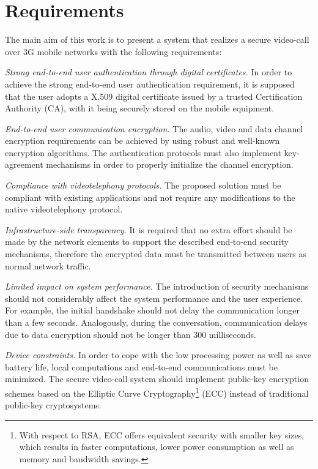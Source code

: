 \documentclass[10pt, conference, compsocconf]{IEEEtran}
\begin{document}
\section{Requirements}
\label{par:requirements}
The main aim of this work is to present a system that realizes a secure video-call over 3G mobile networks with the following requirements:
\begin{list}{}{\leftmargin=1em}
  \item \textit{Strong end-to-end user authentication through digital certificates.}
In order to achieve the strong end-to-end user authentication requirement, it is supposed that the user adopts a X.509 digital certificate issued by a trusted Certification Authority (CA), with it being securely stored on the mobile equipment.
  \item \textit{End-to-end user communication encryption.}
The audio, video and data channel encryption requirements can be achieved by using robust and well-known encryption algorithms. The authentication protocols must also implement key-agreement mechanisms in order to properly initialize the channel encryption.
  \item \textit{Compliance with videotelephony protocols.}
The proposed solution must be compliant with existing applications and not require any modifications to the native videotelephony protocol.
  \item \textit{Infrastructure-side transparency.}
It is required that no extra effort should be made by the network elements to support the described end-to-end security mechanisms, therefore the encrypted data must be transmitted between users as normal network traffic.
  \item \textit{Limited impact on system performance.}
The introduction of security mechanisms should not considerably affect the system performance and the user experience. For example, the initial handshake should not delay the communication longer than a few seconds. Analogously, during the conversation, communication delays due to data encryption should not be longer than 300 milliseconds.
\item \textit{Device constraints.}
In order to cope with the low processing power as well as save battery life, local computations and end-to-end communications must be minimized. The secure video-call system should implement public-key encryption schemes based on the Elliptic Curve Cryptography\footnote{With respect to RSA, ECC offers equivalent security with smaller key sizes, which results in faster computations, lower power consumption as well as memory and bandwidth savings.} (ECC) instead of traditional public-key cryptosystems.
\end{list}
\end{document}
